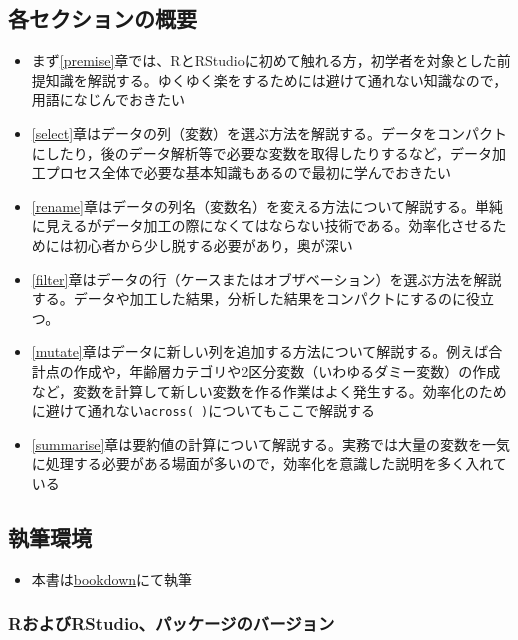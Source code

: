 \documentclass[
  xelatex,ja=standard, b5paper]{bxjsbook}
\providecommand{\tightlist}{%
  \setlength{\itemsep}{0pt}\setlength{\parskip}{0pt}}
\begin{document}
\hypertarget{ux5404ux30bbux30afux30b7ux30e7ux30f3ux306eux6982ux8981}{%
\subsection*{各セクションの概要}\label{ux5404ux30bbux30afux30b7ux30e7ux30f3ux306eux6982ux8981}}

\begin{itemize}
\item
  まず\ref{premise}章では、RとRStudioに初めて触れる方，初学者を対象とした前提知識を解説する。ゆくゆく楽をするためには避けて通れない知識なので，用語になじんでおきたい
\item
  \ref{select}章はデータの列（変数）を選ぶ方法を解説する。データをコンパクトにしたり，後のデータ解析等で必要な変数を取得したりするなど，データ加工プロセス全体で必要な基本知識もあるので最初に学んでおきたい
\item
  \ref{rename}章はデータの列名（変数名）を変える方法について解説する。単純に見えるがデータ加工の際になくてはならない技術である。効率化させるためには初心者から少し脱する必要があり，奥が深い
\item
  \ref{filter}章はデータの行（ケースまたはオブザベーション）を選ぶ方法を解説する。データや加工した結果，分析した結果をコンパクトにするのに役立つ。
\item
  \ref{mutate}章はデータに新しい列を追加する方法について解説する。例えば合計点の作成や，年齢層カテゴリや2区分変数（いわゆるダミー変数）の作成など，変数を計算して新しい変数を作る作業はよく発生する。効率化のために避けて通れない\texttt{across(\ )}についてもここで解説する
\item
  \ref{summarise}章は要約値の計算について解説する。実務では大量の変数を一気に処理する必要がある場面が多いので，効率化を意識した説明を多く入れている
\end{itemize}

\hypertarget{ux57f7ux7b46ux74b0ux5883}{%
\subsection*{執筆環境}\label{ux57f7ux7b46ux74b0ux5883}}

\begin{itemize}
\tightlist
\item
  本書は\href{https://bookdown.org/}{bookdown}にて執筆
\end{itemize}

\hypertarget{rux304aux3088ux3073rstudioux30d1ux30c3ux30b1ux30fcux30b8ux306eux30d0ux30fcux30b8ux30e7ux30f3}{%
\subsubsection*{RおよびRStudio、パッケージのバージョン}\label{rux304aux3088ux3073rstudioux30d1ux30c3ux30b1ux30fcux30b8ux306eux30d0ux30fcux30b8ux30e7ux30f3}}
\end{document}
